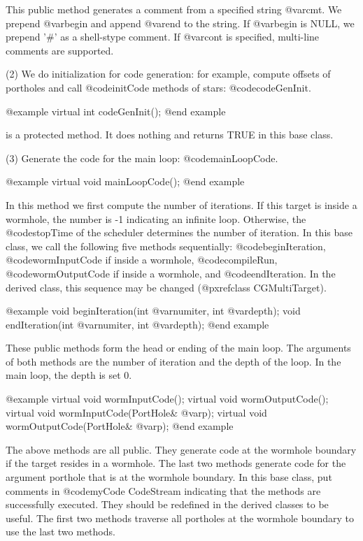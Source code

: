 This public method generates a comment from a specified string @var{cmt}.
We prepend @var{begin} and append @var{end} to the string. If @var{begin}
is NULL, we prepend '#' as a shell-stype comment. If @var{cont} is 
specified, multi-line comments are supported.

(2) We do initialization for code generation: for example, compute
offsets of portholes and call @code{initCode} methods of stars:
@code{codeGenInit}.

@example
virtual int codeGenInit();
@end example

is a protected method. It does nothing and returns TRUE in this
base class.

(3) Generate the code for the main loop: @code{mainLoopCode}.

@example
virtual void mainLoopCode();
@end example

In this method we first compute the number of iterations. If this
target is inside a wormhole, the number is -1 indicating an infinite
loop. Otherwise, the @code{stopTime} of the scheduler determines the number
of iteration.  In this base class, we call the following five methods
sequentially: @code{beginIteration}, @code{wormInputCode} if inside a 
wormhole, @code{compileRun}, @code{wormOutputCode} if inside a wormhole, and
@code{endIteration}. In the derived class, this sequence may be changed
(@pxref{class CGMultiTarget}).

@example
void beginIteration(int @var{numiter}, int @var{depth});
void endIteration(int @var{numiter}, int @var{depth});
@end example

These public methods form the head or ending of the main loop. The
arguments of both methods are the number of iteration and the depth of
the loop. In the main loop, the depth is set 0.

@example
virtual void wormInputCode();
virtual void wormOutputCode();
virtual void wormInputCode(PortHole& @var{p});
virtual void wormOutputCode(PortHole& @var{p});
@end example

The above methods are all public. They generate code at the wormhole
boundary if the target resides in a wormhole. The last two methods
generate code for the argument porthole that is at the wormhole
boundary. In this base class, put comments in @code{myCode} CodeStream
indicating that the methods are successfully executed. They should be
redefined in the derived classes to be useful. The first two methods
traverse all portholes at the wormhole boundary to use the last two
methods.


